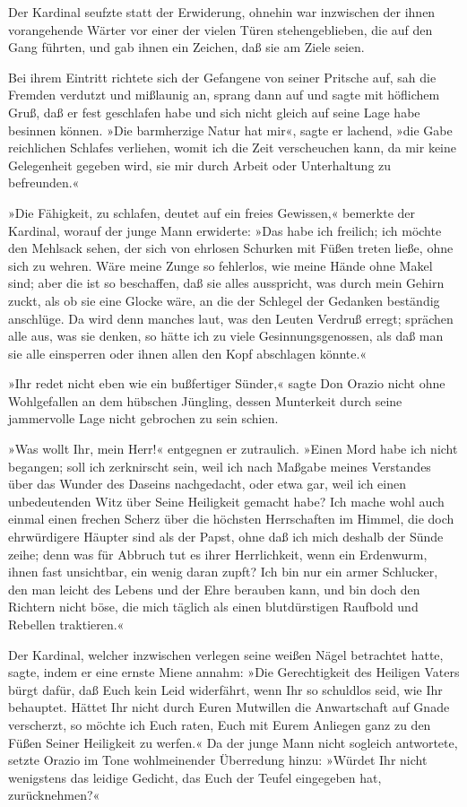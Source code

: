 Der Kardinal seufzte statt der Erwiderung, ohnehin war inzwischen
der ihnen vorangehende Wärter vor einer der vielen Türen
stehengeblieben, die auf den Gang führten, und gab ihnen ein
Zeichen, daß sie am Ziele seien.

Bei ihrem Eintritt richtete sich der Gefangene von seiner Pritsche
auf, sah die Fremden verdutzt und mißlaunig an, sprang dann auf und
sagte mit höflichem Gruß, daß er fest geschlafen habe und sich
nicht gleich auf seine Lage habe besinnen können. »Die barmherzige
Natur hat mir«, sagte er lachend, »die Gabe reichlichen Schlafes
verliehen, womit ich die Zeit verscheuchen kann, da mir keine
Gelegenheit gegeben wird, sie mir durch Arbeit oder Unterhaltung zu
befreunden.«

»Die Fähigkeit, zu schlafen, deutet auf ein freies Gewissen,«
bemerkte der Kardinal, worauf der junge Mann erwiderte: »Das habe
ich freilich; ich möchte den Mehlsack sehen, der sich von ehrlosen
Schurken mit Füßen treten ließe, ohne sich zu wehren. Wäre meine
Zunge so fehlerlos, wie meine Hände ohne Makel sind; aber die ist
so beschaffen, daß sie alles ausspricht, was durch mein Gehirn
zuckt, als ob sie eine Glocke wäre, an die der Schlegel der
Gedanken beständig anschlüge. Da wird denn manches laut, was den
Leuten Verdruß erregt; sprächen alle aus, was sie denken, so hätte
ich zu viele Gesinnungsgenossen, als daß man sie alle einsperren
oder ihnen allen den Kopf abschlagen könnte.«

»Ihr redet nicht eben wie ein bußfertiger Sünder,« sagte Don Orazio
nicht ohne Wohlgefallen an dem hübschen \pagenum{[59]} Jüngling,
dessen Munterkeit durch seine jammervolle Lage nicht gebrochen zu
sein schien.

»Was wollt Ihr, mein Herr!« entgegnen er zutraulich. »Einen Mord
habe ich nicht begangen; soll ich zerknirscht sein, weil ich nach
Maßgabe meines Verstandes über das Wunder des Daseins nachgedacht,
oder etwa gar, weil ich einen unbedeutenden Witz über Seine
Heiligkeit gemacht habe? Ich mache wohl auch einmal einen frechen
Scherz über die höchsten Herrschaften im Himmel, die doch
ehrwürdigere Häupter sind als der Papst, ohne daß ich mich deshalb
der Sünde zeihe; denn was für Abbruch tut es ihrer Herrlichkeit,
wenn ein Erdenwurm, ihnen fast unsichtbar, ein wenig daran zupft?
Ich bin nur ein armer Schlucker, den man leicht des Lebens und der
Ehre berauben kann, und bin doch den Richtern nicht böse, die mich
täglich als einen blutdürstigen Raufbold und Rebellen traktieren.«

Der Kardinal, welcher inzwischen verlegen seine weißen Nägel
betrachtet hatte, sagte, indem er eine ernste Miene annahm: »Die
Gerechtigkeit des Heiligen Vaters bürgt dafür, daß Euch kein Leid
widerfährt, wenn Ihr so schuldlos seid, wie Ihr behauptet. Hättet
Ihr nicht durch Euren Mutwillen die Anwartschaft auf Gnade
verscherzt, so möchte ich Euch raten, Euch mit Eurem Anliegen ganz
zu den Füßen Seiner Heiligkeit zu werfen.« Da der junge Mann nicht
sogleich antwortete, setzte Orazio im Tone wohlmeinender Überredung
hinzu: »Würdet Ihr nicht wenigstens das leidige Gedicht, das Euch
der Teufel eingegeben hat, zurücknehmen?«

